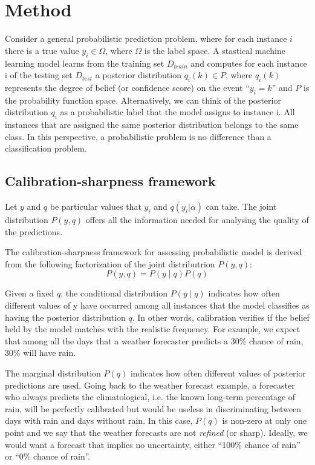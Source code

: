\chapter{Method}

Consider a general probabilistic prediction problem, where for each instance $i$ there is a true value $y_i \in \Omega$, where $\Omega$ is the label space. A stastical machine learning model learns from the training set $D_{train}$ and computes for each instance i of the testing set $D_{test}$ a posterior distribution $q_i(k) \in P$, where $q_i(k)$ represents the degree of belief (or confidence score) on the event ``$y_i=k$'' and $P$ is the probability function space. Alternatively, we can think of the posterior distribution $q_i$ as a probabilistic label that the model assigns to instance i. All instances that are assigned the same posterior distribution belongs to the same class. In this perspective, a probabilistic problem is no difference than a classification problem.  

\section{Calibration-sharpness framework}

Let $y$ and $q$ be particular values that $y_i$ and $q(y_i | \alpha)$ can take. The joint distribution $P(y, q)$ offers all the information needed for analysing the quality of the predictions. 

The calibration-sharpness framework for assessing probabilistic model is derived from the following factorization of the joint distributrion $P(y, q)$:
$$P(y, q) = P(y \mid q)P(q)$$

Given a fixed $q$, the conditional distribution $P(y \mid q)$ indicates how often different values of y have occurred among all instances that the model classifies as having the posterior distribution $q$. In other words, calibration verifies if the belief held by the model matches with the realistic frequency. For example, we expect that among all the days that a weather forecaster predicts a 30\% chance of rain, 30\% will have rain. 

The marginal distribution $P(q)$ indicates how often different values of posterior predictions are used. Going back to the weather forecast example, a forecaster who always predicts the climatological, i.e. the known long-term percentage of rain, will be perfectly calibrated but would be useless in discriminating between days with rain and days without rain. In this case, $P(q)$ is non-zero at only one point and we say that the weather forecasts are not \textit{refined} (or sharp). Ideally, we would want a forecast that implies no uncertainty, either ``100\% chance of rain'' or ``0\% chance of rain''. 

